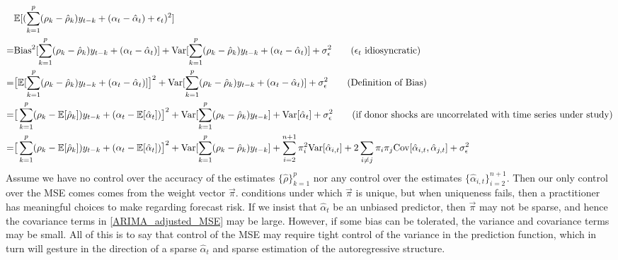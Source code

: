 \documentclass{uiucthesis2021}
\def\E{\mathbb{E}} %
\theoremstyle{definition}
\begin{document}
  \begin{align}
    &\E[(\sum^{p}_{k=1}(\rho_{k}-\hat\rho_{k})y_{t-k} + (\alpha_{t} - \hat{\alpha}_{t}) + \epsilon_{t} )^{2}]\notag\\
    = &\text{Bias}^{2}[\sum^{p}_{k=1}(\rho_{k}-\hat\rho_{k})y_{t-k} + (\alpha_{t} - \hat{\alpha}_{t}) ] + \text{Var}[\sum^{p}_{k=1}(\rho_{k}-\hat\rho_{k})y_{t-k} + (\alpha_{t} - \hat{\alpha}_{t}) ] + \sigma^{2}_{\epsilon}\tag{$\epsilon_{t}$ idiosyncratic}\\
    = &\big[\E[\sum^{p}_{k=1}(\rho_{k}-\hat\rho_{k})y_{t-k} + (\alpha_{t} - \hat{\alpha}_{t}) ]\big]^{2} + \text{Var}[\sum^{p}_{k=1}(\rho_{k}-\hat\rho_{k})y_{t-k} + (\alpha_{t} - \hat{\alpha}_{t})]  + \sigma^{2}_{\epsilon}\tag{Definition of Bias}\\
    = &\big[\sum^{p}_{k=1}(\rho_{k}-\E[\hat\rho_{k}])y_{t-k} + (\alpha_{t} - \E[\hat{\alpha}_{t}]) \big]^{2} + \text{Var}[\sum^{p}_{k=1}(\rho_{k}-\hat\rho_{k})y_{t-k}] + \text{Var}[\hat{\alpha}_{t}]  + \sigma^{2}_{\epsilon}\tag{if donor shocks are uncorrelated with time series under study}\\
    = &\big[\sum^{p}_{k=1}(\rho_{k}-\E[\hat\rho_{k}])y_{t-k} + (\alpha_{t} - \E[\hat{\alpha}_{t}]) \big]^{2} + \text{Var}[\sum^{p}_{k=1}(\rho_{k}-\hat\rho_{k})y_{t-k}] + \sum_{i=2}^{n+1}\pi_{i}^{2}\text{Var}[\hat\alpha_{i,t}] + 2\sum_{i\neq j}\pi_{i}\pi_{j}\text{Cov}[\hat\alpha_{i,t},\hat\alpha_{j,t}]  + \sigma^{2}_{\epsilon}\label{ARIMA_adjusted_MSE}
  \end{align}
  Assume we have no control over the accuracy of the estimates $\{\hat\rho\}^{p}_{k=1}$ nor any control over the estimates $\{\hat\alpha_{i,t}\}_{i=2}^{n+1}$.  Then our only control over the MSE comes comes from the weight vector $\vec{\pi}$.  \cite[][]{lundquist2024volatility} conditions under which $\vec{\pi}$ is unique, but when uniqueness fails, then a practitioner has meaningful choices to make regarding forecast risk.  If we insist that $\hat\alpha_{t}$ be an unbiased predictor, then $\vec{\pi}$ may not be sparse, and hence the covariance terms in \ref{ARIMA_adjusted_MSE} may be large.  However, if some bias can be tolerated, the variance and covariance terms may be small.  All of this is to say that control of the MSE may require tight control of the variance in the prediction function, which in turn will gesture in the direction of a sparse $\hat\alpha_{t}$ and sparse estimation of the autoregressive structure.
  
\end{document}
